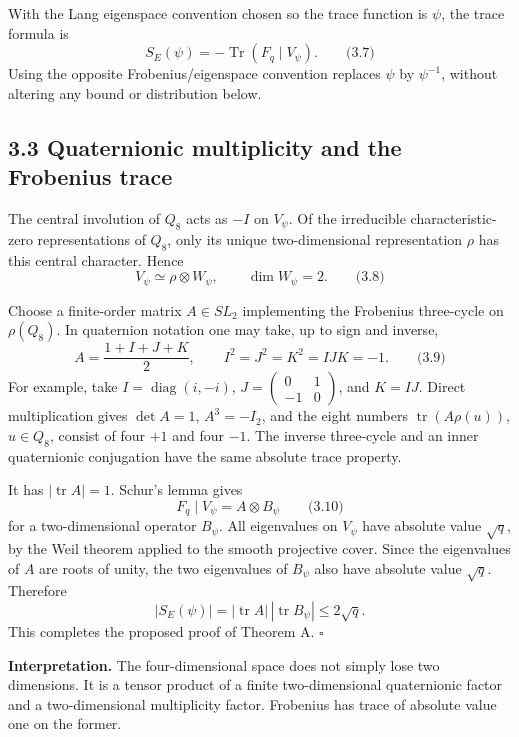 \documentclass[
  11pt,
  a4paper,
]{article}
\begin{document}
With the Lang eigenspace convention chosen so the trace function is
\(\psi\), the trace formula is \[
S_E(\psi)=-\operatorname{Tr}(F_q\mid V_\psi).
\qquad \text{(3.7)}
\] Using the opposite Frobenius/eigenspace convention replaces \(\psi\)
by \(\psi^{-1}\), without altering any bound or distribution below.

\subsection{3.3 Quaternionic multiplicity and the Frobenius
trace}\label{quaternionic-multiplicity-and-the-frobenius-trace}

The central involution of \(Q_8\) acts as \(-I\) on \(V_\psi\). Of the
irreducible characteristic-zero representations of \(Q_8\), only its
unique two-dimensional representation \(\rho\) has this central
character. Hence \[
V_\psi\simeq\rho\otimes W_\psi,
\qquad \dim W_\psi=2.
\qquad \text{(3.8)}
\]

Choose a finite-order matrix \(A\in SL_2\) implementing the Frobenius
three-cycle on \(\rho(Q_8)\). In quaternion notation one may take, up to
sign and inverse, \[
A=\frac{1+I+J+K}{2},\qquad I^2=J^2=K^2=IJK=-1.
\qquad \text{(3.9)}
\] For example, take \(I=\operatorname{diag}(i,-i)\),
\(J=\left(\begin{smallmatrix}0&1\\-1&0\end{smallmatrix}\right)\), and
\(K=IJ\). Direct multiplication gives \(\det A=1\), \(A^3=-I_2\), and
the eight numbers \(\operatorname{tr}(A\rho(u))\), \(u\in Q_8\), consist
of four \(+1\) and four \(-1\). The inverse three-cycle and an inner
quaternionic conjugation have the same absolute trace property.

It has \(|\operatorname{tr}A|=1\). Schur's lemma gives \[
F_q\mid V_\psi=A\otimes B_\psi
\qquad \text{(3.10)}
\] for a two-dimensional operator \(B_\psi\). All eigenvalues on
\(V_\psi\) have absolute value \(\sqrt q\), by the Weil theorem applied
to the smooth projective cover. Since the eigenvalues of \(A\) are roots
of unity, the two eigenvalues of \(B_\psi\) also have absolute value
\(\sqrt q\). Therefore \[
|S_E(\psi)|=|\operatorname{tr}A|\,|\operatorname{tr}B_\psi|
\le2\sqrt q.
\] This completes the proposed proof of Theorem A. \(\square\)

\textbf{Interpretation.} The four-dimensional space does not simply lose
two dimensions. It is a tensor product of a finite two-dimensional
quaternionic factor and a two-dimensional multiplicity factor. Frobenius
has trace of absolute value one on the former.
\end{document}
